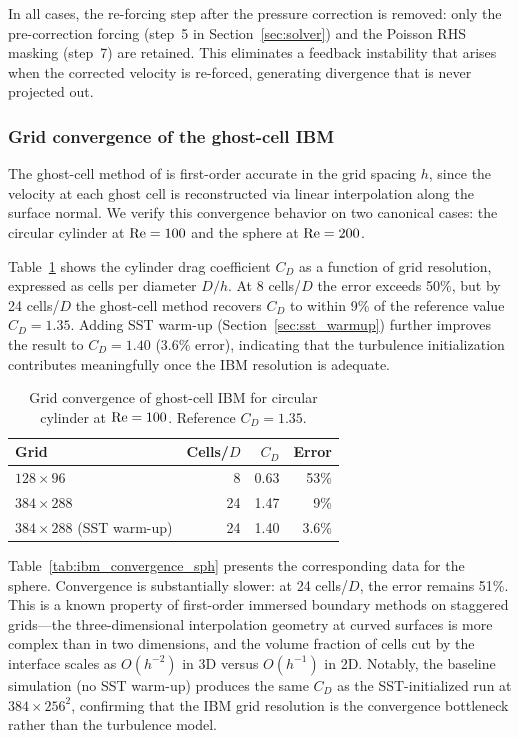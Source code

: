 In all cases, the re-forcing step after the pressure correction is removed: only the pre-correction forcing (step~5 in Section~\ref{sec:solver}) and the Poisson RHS masking (step~7) are retained.
This eliminates a feedback instability that arises when the corrected velocity is re-forced, generating divergence that is never projected out.

\subsubsection{Grid convergence of the ghost-cell IBM}
\label{sec:ibm_grid_convergence}

The ghost-cell method of \citet{Fadlun2000} is first-order accurate in the grid spacing $h$, since the velocity at each ghost cell is reconstructed via linear interpolation along the surface normal.
We verify this convergence behavior on two canonical cases: the circular cylinder at $\mathrm{Re} = 100$ and the sphere at $\mathrm{Re} = 200$.

Table~\ref{tab:ibm_convergence_cyl} shows the cylinder drag coefficient $C_D$ as a function of grid resolution, expressed as cells per diameter $D/h$.
At 8 cells/$D$ the error exceeds 50\%, but by 24 cells/$D$ the ghost-cell method recovers $C_D$ to within 9\% of the reference value $C_D = 1.35$.
Adding SST warm-up (Section~\ref{sec:sst_warmup}) further improves the result to $C_D = 1.40$ (3.6\% error), indicating that the turbulence initialization contributes meaningfully once the IBM resolution is adequate.

\begin{table}[htbp]
\centering
\caption{Grid convergence of ghost-cell IBM for circular cylinder at $\mathrm{Re} = 100$. Reference $C_D = 1.35$.}
\label{tab:ibm_convergence_cyl}
\begin{tabular}{lrrr}
\toprule
Grid & Cells/$D$ & $C_D$ & Error \\
\midrule
$128 \times 96$  & 8  & 0.63 & 53\% \\
$384 \times 288$ & 24 & 1.47 & 9\%  \\
$384 \times 288$ (SST warm-up) & 24 & 1.40 & 3.6\% \\
\bottomrule
\end{tabular}
\end{table}

Table~\ref{tab:ibm_convergence_sph} presents the corresponding data for the sphere.
Convergence is substantially slower: at 24 cells/$D$, the error remains 51\%.
This is a known property of first-order immersed boundary methods on staggered grids---the three-dimensional interpolation geometry at curved surfaces is more complex than in two dimensions, and the volume fraction of cells cut by the interface scales as $O(h^{-2})$ in 3D versus $O(h^{-1})$ in 2D.
Notably, the baseline simulation (no SST warm-up) produces the same $C_D$ as the SST-initialized run at $384 \times 256^2$, confirming that the IBM grid resolution is the convergence bottleneck rather than the turbulence model.

